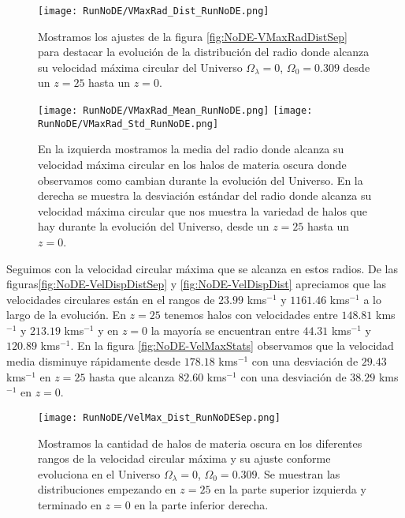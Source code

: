 \begin{figure}[H]
    \centering
    \texttt{[image: RunNoDE/VMaxRad\_Dist\_RunNoDE.png]}
    \caption[Distribución del radio donde se alcanza la velocidad máxima circular]{\footnotesize Mostramos los ajustes de la figura \ref{fig:NoDE-VMaxRadDistSep} para destacar la evolución de la distribución del radio donde alcanza su velocidad máxima circular del Universo $\Omega_\lambda = 0$, $\Omega_0 = 0.309$ desde un $z=25$ hasta un $z=0$.}
    \label{fig:NoDE-VMaxRadDist}
\end{figure}

\begin{figure}[H]
    \centering
    \texttt{[image: RunNoDE/VMaxRad\_Mean\_RunNoDE.png]}
    \texttt{[image: RunNoDE/VMaxRad\_Std\_RunNoDE.png]}
    \caption[Media y desviación estándar del Radio donde se alcanza la velocidad máxima circular]{\footnotesize En la izquierda mostramos la media del radio donde alcanza su velocidad máxima circular en los halos de materia oscura donde observamos como cambian durante la evolución del Universo. En la derecha se muestra la desviación estándar del radio donde alcanza su velocidad máxima circular que nos muestra la variedad de halos que hay durante la evolución del Universo, desde un $z=25$ hasta un $z=0$.}
    \label{fig:NoDE-VMaxRadStats}
\end{figure}

Seguimos con la velocidad circular máxima que se alcanza en estos radios. De las figuras\ref{fig:NoDE-VelDispDistSep} y \ref{fig:NoDE-VelDispDist} apreciamos que las velocidades circulares están en el rangos de $23.99$ kms$^{-1}$ y $1161.46$ kms$^{-1}$ a lo largo de la evolución. En $z=25$ tenemos halos con velocidades entre $148.81$ kms$^{-1}$ y $213.19$ kms$^{-1}$ y en $z=0$ la mayoría se encuentran entre $44.31$ kms$^{-1}$ y $120.89$ kms$^{-1}$. En la figura \ref{fig:NoDE-VelMaxStats} observamos que la velocidad media disminuye rápidamente desde $178.18$ kms$^{-1}$ con una desviación de $29.43$ kms$^{-1}$ en $z=25$ hasta que alcanza $82.60$ kms$^{-1}$ con una desviación de $38.29$ kms$^{-1}$ en $z=0$. 

\begin{figure}[H]
    \centering
    \texttt{[image: RunNoDE/VelMax\_Dist\_RunNoDESep.png]}
    \caption[Velocidad circular máxima]{\footnotesize Mostramos la cantidad de halos de materia oscura en los diferentes rangos de la velocidad circular máxima y su ajuste conforme evoluciona en el Universo $\Omega_\lambda = 0$, $\Omega_0 = 0.309$. Se muestran las distribuciones empezando en $z=25$ en la parte superior izquierda y terminado en $z=0$ en la parte inferior derecha.}
    \label{fig:NoDE-VelMaxDistSep}
\end{figure}

